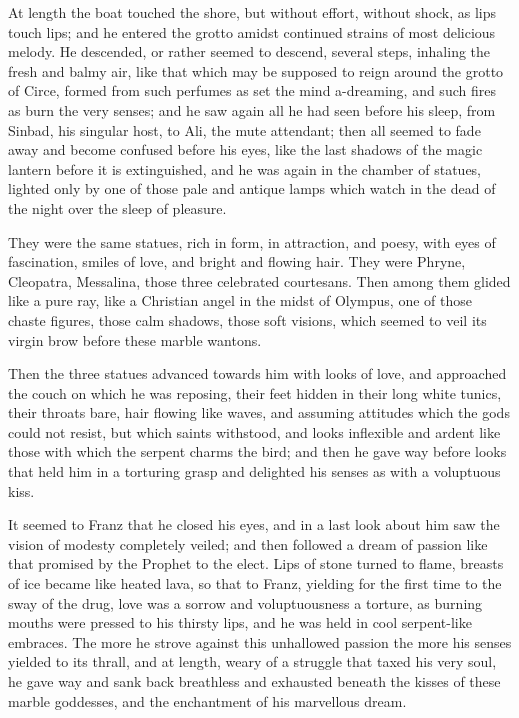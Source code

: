 At length the boat touched the shore, but without effort, without
shock, as lips touch lips; and he entered the grotto amidst continued
strains of most delicious melody. He descended, or rather seemed to
descend, several steps, inhaling the fresh and balmy air, like that
which may be supposed to reign around the grotto of Circe, formed from
such perfumes as set the mind a-dreaming, and such fires as burn the
very senses; and he saw again all he had seen before his sleep, from
Sinbad, his singular host, to Ali, the mute attendant; then all seemed
to fade away and become confused before his eyes, like the last shadows
of the magic lantern before it is extinguished, and he was again in the
chamber of statues, lighted only by one of those pale and antique lamps
which watch in the dead of the night over the sleep of pleasure.

They were the same statues, rich in form, in attraction, and poesy,
with eyes of fascination, smiles of love, and bright and flowing hair.
They were Phryne, Cleopatra, Messalina, those three celebrated
courtesans. Then among them glided like a pure ray, like a Christian
angel in the midst of Olympus, one of those chaste figures, those calm
shadows, those soft visions, which seemed to veil its virgin brow
before these marble wantons.

Then the three statues advanced towards him with looks of love, and
approached the couch on which he was reposing, their feet hidden in
their long white tunics, their throats bare, hair flowing like waves,
and assuming attitudes which the gods could not resist, but which
saints withstood, and looks inflexible and ardent like those with which
the serpent charms the bird; and then he gave way before looks that
held him in a torturing grasp and delighted his senses as with a
voluptuous kiss.

It seemed to Franz that he closed his eyes, and in a last look about
him saw the vision of modesty completely veiled; and then followed a
dream of passion like that promised by the Prophet to the elect. Lips
of stone turned to flame, breasts of ice became like heated lava, so
that to Franz, yielding for the first time to the sway of the drug,
love was a sorrow and voluptuousness a torture, as burning mouths were
pressed to his thirsty lips, and he was held in cool serpent-like
embraces. The more he strove against this unhallowed passion the more
his senses yielded to its thrall, and at length, weary of a struggle
that taxed his very soul, he gave way and sank back breathless and
exhausted beneath the kisses of these marble goddesses, and the
enchantment of his marvellous dream.
